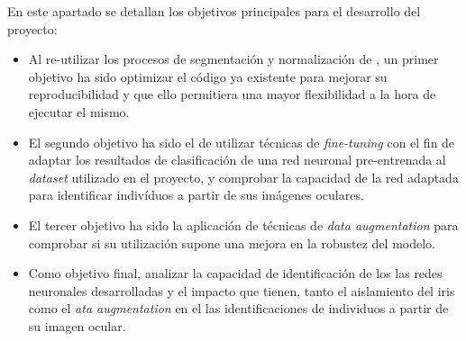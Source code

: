  \label{capitulo2}

En este apartado se detallan los objetivos principales para el desarrollo del proyecto:
\begin{itemize}
    \item Al re-utilizar los procesos de segmentación y normalización de \cite{tfg_iris_2020}, un primer objetivo ha sido optimizar el código ya existente para 
    mejorar su reproducibilidad y que ello permitiera una mayor flexibilidad a la hora de ejecutar el mismo.
    \item El segundo objetivo ha sido el de utilizar técnicas de \textit{fine-tuning} con el fin de adaptar los resultados de clasificación de una red neuronal pre-entrenada al \textit{dataset} utilizado en el proyecto, y comprobar la capacidad de la red adaptada para identificar indivíduos a partir de sus imágenes oculares.
    \item El tercer objetivo ha sido la aplicación de técnicas de \textit{data augmentation} para comprobar si su utilización supone una mejora en la robustez del modelo.
    \item Como objetivo final, analizar la capacidad de identificación de los las redes neuronales desarrolladas y el impacto que tienen, tanto el aislamiento del iris como el \textit{ata augmentation} en el las identificaciones de individuos a partir de su imagen ocular.                                                                                                                                                                                                           
\end{itemize}

